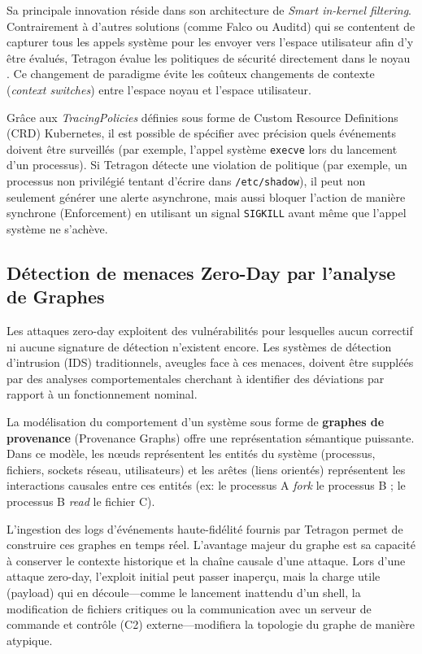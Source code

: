 \documentclass[a4paper,12pt]{article}
\begin{document}
Sa principale innovation réside dans son architecture de \textit{Smart in-kernel filtering}. Contrairement à d'autres solutions (comme Falco ou Auditd) qui se contentent de capturer tous les appels système pour les envoyer vers l'espace utilisateur afin d'y être évalués, Tetragon évalue les politiques de sécurité directement dans le noyau \cite{cilium_web}. Ce changement de paradigme évite les coûteux changements de contexte (\textit{context switches}) entre l'espace noyau et l'espace utilisateur.

Grâce aux \textit{TracingPolicies} définies sous forme de Custom Resource Definitions (CRD) Kubernetes, il est possible de spécifier avec précision quels événements doivent être surveillés (par exemple, l'appel système \texttt{execve} lors du lancement d'un processus). Si Tetragon détecte une violation de politique (par exemple, un processus non privilégié tentant d'écrire dans \texttt{/etc/shadow}), il peut non seulement générer une alerte asynchrone, mais aussi bloquer l'action de manière synchrone (Enforcement) en utilisant un signal \texttt{SIGKILL} avant même que l'appel système ne s'achève.

\subsection{Détection de menaces Zero-Day par l'analyse de Graphes}
Les attaques zero-day exploitent des vulnérabilités pour lesquelles aucun correctif ni aucune signature de détection n'existent encore. Les systèmes de détection d'intrusion (IDS) traditionnels, aveugles face à ces menaces, doivent être suppléés par des analyses comportementales cherchant à identifier des déviations par rapport à un fonctionnement nominal.

La modélisation du comportement d'un système sous forme de \textbf{graphes de provenance} (Provenance Graphs) offre une représentation sémantique puissante. Dans ce modèle, les nœuds représentent les entités du système (processus, fichiers, sockets réseau, utilisateurs) et les arêtes (liens orientés) représentent les interactions causales entre ces entités (ex: le processus A \textit{fork} le processus B ; le processus B \textit{read} le fichier C).

L'ingestion des logs d'événements haute-fidélité fournis par Tetragon permet de construire ces graphes en temps réel. L'avantage majeur du graphe est sa capacité à conserver le contexte historique et la chaîne causale d'une attaque. Lors d'une attaque zero-day, l'exploit initial peut passer inaperçu, mais la charge utile (payload) qui en découle—comme le lancement inattendu d'un shell, la modification de fichiers critiques ou la communication avec un serveur de commande et contrôle (C2) externe—modifiera la topologie du graphe de manière atypique. 
\end{document}
